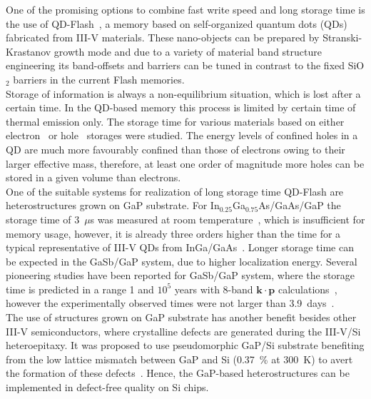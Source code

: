 One of the promising options to combine fast write speed and long storage time is the use of QD-Flash~\citep{Geller_APL2008_QDFlash}, a memory based on self-organized quantum dots (QDs) fabricated from III-V materials. These nano-objects can be prepared by Stranski-Krastanov growth mode and due to a variety of material band structure engineering its band-offsets and barriers can be tuned in contrast to the fixed SiO$_2$ barriers in the current Flash memories.\\
%
\indent Storage of information is always a non-equilibrium situation, which is lost after a certain time. In the QD-based memory this process is limited by certain time of thermal emission only. The storage time for various materials based on either electron~\citep{Anand_apl1995_elflash,Nowozin_2013_sum} or hole~\citep{GellerPRB, stracke_apl2012_qdflash_GaP,Nowozin_2013_sum} storages were studied. The energy levels of confined holes in a QD are much more favourably confined than those of electrons owing to their larger effective mass, therefore, at least one order of magnitude more holes can be stored in a given volume than electrons. \\
%
\indent One of the suitable systems for realization of long storage time QD-Flash are heterostructures grown on GaP substrate. For In$_{0.25}$Ga$_{0.75}$As/GaAs/GaP the storage time of 3~$\mu$s was measured at room temperature~\citep{stracke_apl2012_qdflash_GaP}, which is insufficient for memory usage, however, it is already three orders higher than the time for a typical representative of III-V QDs from InGa/GaAs~\citep{GellerPRB}. Longer storage time can be expected in the GaSb/GaP system, due to higher localization energy. Several pioneering studies have been reported for GaSb/GaP system, where the storage time is predicted in a range 1 and $10^5$ years with 8-band $\mathbf{k\cdot p}$ calculations~\citep{Bimberg_proceedingSPIE}, however the experimentally observed times were not larger than 3.9~days~\citep{Bonato_pssolidi_GaSbonGaP}.\\%
%
\indent The use of structures grown on GaP substrate has another benefit besides other III-V semiconductors, where crystalline defects are generated during the III-V/Si heteroepitaxy. It was proposed to use pseudomorphic GaP/Si substrate benefiting from the low lattice mismatch between GaP and Si (0.37~\% at 300~K) to avert the formation of these defects~\citep{Beyer_jap2013,Grassman_apl2013, Lin_jcg2013}. Hence, the GaP-based heterostructures can be implemented in defect-free quality on Si chips.

